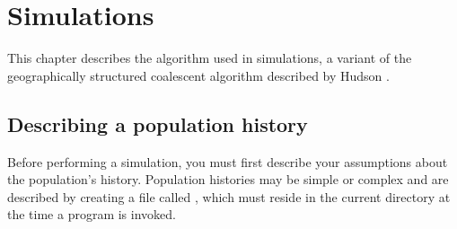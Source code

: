 \chapter{Simulations\label{ch.simulate}}

This chapter describes the algorithm used in simulations, a variant of
the geographically structured coalescent algorithm described by Hudson
\cite{Hudson:OSE-7-1}.  

\section{Describing a population history\label{sec.pophist}}

Before performing a simulation, you must first describe your
assumptions about the population's history.  Population histories may
be simple or complex and are described by creating a file called
, which must reside in the current directory at the
time a program is invoked.

